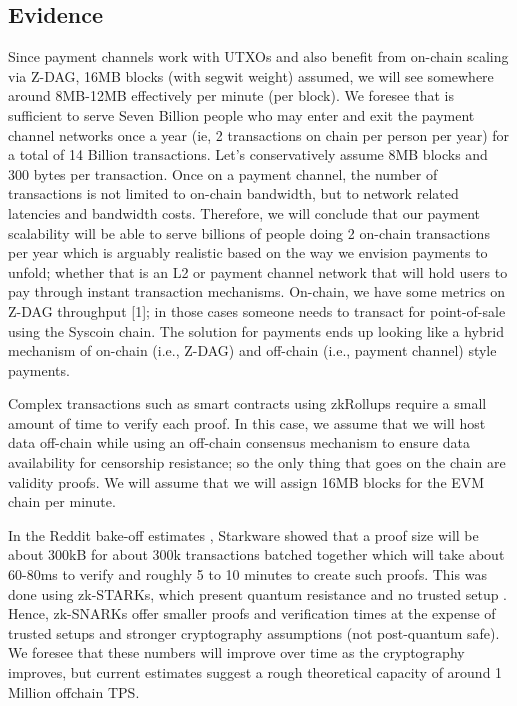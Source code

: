 \documentclass[peerreview]{ieeesyscoin}
\begin{document}
\subsection{Evidence}

Since payment channels work with UTXOs and also benefit from on-chain scaling via Z-DAG, 16MB blocks (with segwit weight) assumed, we will see somewhere around 8MB-12MB effectively per minute (per block). We foresee that is sufficient to serve Seven Billion people who may enter and exit the payment channel networks once a year (ie, 2 transactions on chain per person per year) for a total of 14 Billion transactions. Let’s conservatively assume 8MB blocks and 300 bytes per transaction. Once on a payment channel, the number of transactions is not limited to on-chain bandwidth, but to network related latencies and bandwidth costs. Therefore, we will conclude that our payment scalability will be able to serve billions of people doing 2 on-chain transactions per year which is arguably realistic based on the way we envision payments to unfold; whether that is an L2 or payment channel network that will hold users to pay through instant transaction mechanisms. On-chain, we have some metrics on Z-DAG throughput [1]; in those cases someone needs to transact for point-of-sale using the Syscoin chain. The solution for payments ends up looking like a hybrid mechanism of on-chain (i.e., Z-DAG) and off-chain (i.e., payment channel) style payments.

Complex transactions such as smart contracts using zkRollups require a small amount of time to verify each proof. In this case, we assume that we will host data off-chain while using an off-chain consensus mechanism to ensure data availability for censorship resistance; so the only thing that goes on the chain are validity proofs. We will assume that we will assign 16MB blocks for the EVM chain per minute. 

In the Reddit bake-off estimates \cite{Sta20a}, Starkware showed that a proof size will be about 300kB for about 300k transactions batched together which will take about 60-80ms to verify and roughly 5 to 10 minutes to create such proofs. This was done using zk-STARKs, which present quantum resistance and no trusted setup . Hence, zk-SNARKs offer smaller proofs and verification times at the expense of trusted setups and stronger cryptography assumptions (not post-quantum safe). We foresee that these numbers will improve over time as the cryptography improves, but current estimates suggest a rough theoretical capacity of around 1 Million offchain TPS. 
\end{document}
